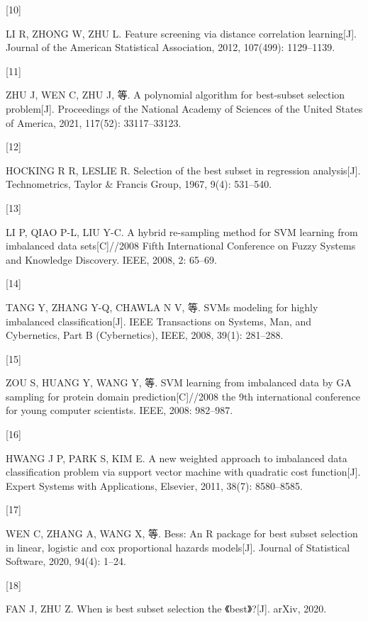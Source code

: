 \documentclass[
]{ctexart}
\newlength{\cslhangindent}
\newlength{\csllabelwidth}
\newenvironment{CSLReferences}[2] %
 {%
  \setlength{\parindent}{0pt}
  \ifodd #1 \everypar{\setlength{\hangindent}{\cslhangindent}}\ignorespaces\fi
  \ifnum #2 > 0
  \setlength{\parskip}{#2\baselineskip}
  \fi
 }%
 {}
\newcommand{\CSLLeftMargin}[1]{\parbox[t]{\csllabelwidth}{#1}}
\newcommand{\CSLRightInline}[1]{\parbox[t]{\linewidth - \csllabelwidth}{#1}\break}
\begin{document}
\begin{CSLReferences}{0}{0}
\leavevmode{}%
\CSLLeftMargin{{[}10{]} }
\CSLRightInline{LI R, ZHONG W, ZHU L. {Feature screening via distance
correlation learning}{[}J{]}. Journal of the American Statistical
Association, 2012, 107(499): 1129--1139.}

\leavevmode{}%
\CSLLeftMargin{{[}11{]} }
\CSLRightInline{ZHU J, WEN C, ZHU J, 等. {A polynomial algorithm for
best-subset selection problem}{[}J{]}. Proceedings of the National
Academy of Sciences of the United States of America, 2021, 117(52):
33117--33123.}

\leavevmode{}%
\CSLLeftMargin{{[}12{]} }
\CSLRightInline{HOCKING R R, LESLIE R. Selection of the best subset in
regression analysis{[}J{]}. Technometrics, Taylor \& Francis Group,
1967, 9(4): 531--540.}

\leavevmode{}%
\CSLLeftMargin{{[}13{]} }
\CSLRightInline{LI P, QIAO P-L, LIU Y-C. A hybrid re-sampling method for
SVM learning from imbalanced data sets{[}C{]}//2008 Fifth International
Conference on Fuzzy Systems and Knowledge Discovery. IEEE, 2008, 2:
65--69.}

\leavevmode{}%
\CSLLeftMargin{{[}14{]} }
\CSLRightInline{TANG Y, ZHANG Y-Q, CHAWLA N V, 等. SVMs modeling for
highly imbalanced classification{[}J{]}. IEEE Transactions on Systems,
Man, and Cybernetics, Part B (Cybernetics), IEEE, 2008, 39(1):
281--288.}

\leavevmode{}%
\CSLLeftMargin{{[}15{]} }
\CSLRightInline{ZOU S, HUANG Y, WANG Y, 等. SVM learning from imbalanced
data by GA sampling for protein domain prediction{[}C{]}//2008 the 9th
international conference for young computer scientists. IEEE, 2008:
982--987.}

\leavevmode{}%
\CSLLeftMargin{{[}16{]} }
\CSLRightInline{HWANG J P, PARK S, KIM E. A new weighted approach to
imbalanced data classification problem via support vector machine with
quadratic cost function{[}J{]}. Expert Systems with Applications,
Elsevier, 2011, 38(7): 8580--8585.}

\leavevmode{}%
\CSLLeftMargin{{[}17{]} }
\CSLRightInline{WEN C, ZHANG A, WANG X, 等. {Bess: An R package for best
subset selection in linear, logistic and cox proportional hazards
models}{[}J{]}. Journal of Statistical Software, 2020, 94(4): 1--24.}

\leavevmode{}%
\CSLLeftMargin{{[}18{]} }
\CSLRightInline{FAN J, ZHU Z. {When is best subset selection the
{《best》}?}{[}J{]}. arXiv, 2020.}

\end{CSLReferences}
\end{document}
